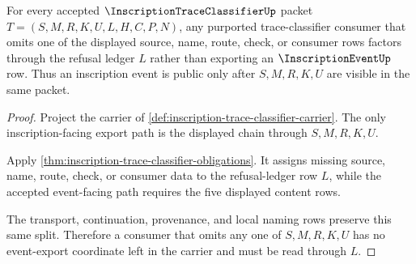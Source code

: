 \begin{theorem}
\label{thm:inscription-trace-classifier-falsifiable-prediction}
For every accepted $\InscriptionTraceClassifierUp$ packet $T=(S,M,R,K,U,L,H,C,P,N)$, any purported trace-classifier consumer that omits one of the displayed source, name, route, check, or consumer rows factors through the refusal ledger $L$ rather than exporting an $\InscriptionEventUp$ row. Thus an inscription event is public only after $S,M,R,K,U$ are visible in the same packet.
\end{theorem}
\begin{proof}
Project the carrier of \autoref{def:inscription-trace-classifier-carrier}. The only inscription-facing export path is the displayed chain through $S,M,R,K,U$.

Apply \autoref{thm:inscription-trace-classifier-obligations}. It assigns missing source, name, route, check, or consumer data to the refusal-ledger row $L$, while the accepted event-facing path requires the five displayed content rows.

The transport, continuation, provenance, and local naming rows preserve this same split. Therefore a consumer that omits any one of $S,M,R,K,U$ has no event-export coordinate left in the carrier and must be read through $L$.
\end{proof}


